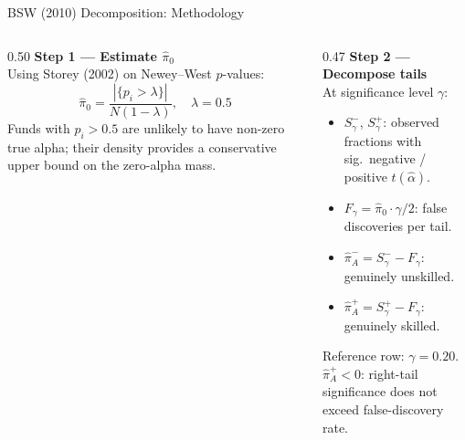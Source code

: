 \documentclass[10pt, aspectratio=169]{beamer}
\begin{document}
\begin{frame}{BSW (2010) Decomposition: Methodology}
  \begin{columns}[T]
    \begin{column}{0.50\textwidth}
      \small\textbf{Step 1 — Estimate $\hat{\pi}_0$}\\[3pt]
      Using Storey (2002) on Newey--West $p$-values:
      \[
        \hat{\pi}_0 = \frac{|\{p_i > \lambda\}|}{N(1-\lambda)}, \quad \lambda = 0.5
      \]
      \footnotesize Funds with $p_i > 0.5$ are unlikely to have non-zero true alpha;
      their density provides a conservative upper bound on the zero-alpha mass.
    \end{column}
    \begin{column}{0.47\textwidth}
      \small\textbf{Step 2 — Decompose tails}\\[3pt]
      \footnotesize At significance level $\gamma$:
      \begin{itemize}\itemsep2pt
        \item $S^-_\gamma$, $S^+_\gamma$: observed fractions with sig.\ negative / positive $t(\hat{\alpha})$.
        \item $F_\gamma = \hat{\pi}_0 \cdot \gamma/2$: false discoveries per tail.
        \item $\hat{\pi}^-_A = S^-_\gamma - F_\gamma$: genuinely unskilled.
        \item $\hat{\pi}^+_A = S^+_\gamma - F_\gamma$: genuinely skilled.
      \end{itemize}
      \vspace{3pt}
      \footnotesize Reference row: $\gamma = 0.20$.\\
      $\hat{\pi}^+_A < 0$: right-tail significance does not exceed false-discovery rate.
    \end{column}
  \end{columns}
\end{frame}
\end{document}
